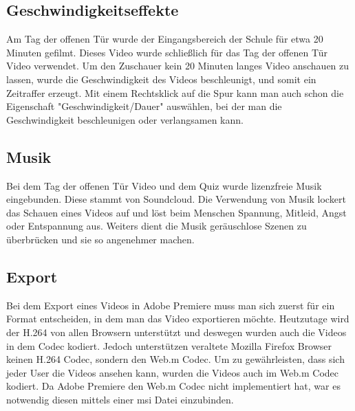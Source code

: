 \subsection{Geschwindigkeitseffekte}
Am Tag der offenen Tür wurde der Eingangsbereich der Schule für etwa 20 Minuten gefilmt. Dieses Video wurde schließlich für das Tag der offenen Tür Video verwendet. Um den Zuschauer kein 20 Minuten langes Video anschauen zu lassen, wurde die Geschwindigkeit des Videos beschleunigt, und somit ein Zeitraffer erzeugt. Mit einem Rechtsklick auf die Spur kann man auch schon die Eigenschaft "Geschwindigkeit/Dauer" auswählen, bei der man die Geschwindigkeit beschleunigen oder verlangsamen kann.\citep{effekte}
\subsection{Musik}
Bei dem Tag der offenen Tür Video und dem Quiz wurde lizenzfreie Musik eingebunden. Diese stammt von Soundcloud. Die Verwendung von Musik lockert das Schauen eines Videos auf und löst beim Menschen Spannung, Mitleid, Angst oder Entspannung aus. Weiters dient die Musik geräuschlose Szenen zu überbrücken und sie so angenehmer machen.\citep{musik}
\subsection{Export}
Bei dem Export eines Videos in Adobe Premiere muss man sich zuerst für ein Format entscheiden, in dem man das Video exportieren möchte. Heutzutage wird der H.264 von allen Browsern unterstützt und deswegen wurden auch die Videos in dem Codec kodiert. Jedoch unterstützen veraltete Mozilla Firefox Browser keinen H.264 Codec, sondern den Web.m Codec. Um zu gewährleisten, dass sich jeder User die Videos ansehen kann, wurden die Videos auch im Web.m Codec kodiert. Da Adobe Premiere den Web.m Codec nicht implementiert hat, war es notwendig diesen mittels einer msi Datei einzubinden.\citep{export}\citep{exportZwei}